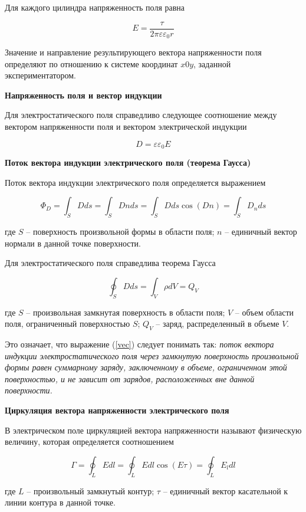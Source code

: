 Для каждого цилиндра напряженность поля равна 

\begin{equation}
	E = \dfrac{\tau}{2\pi\varepsilon\varepsilon_0r}
\end{equation}

Значение и направление результирующего вектора напряженности поля
определяют по отношению к системе координат $ x0y $, заданной
экспериментатором. 

\textbf{Напряженность поля и вектор индукции}

Для электростатического
поля справедливо следующее соотношение между вектором напряженности
поля и вектором электрической индукции

\begin{equation}\label{vec}
	D = \varepsilon\varepsilon_0E
\end{equation}

\textbf{Поток вектора индукции электрического поля (теорема Гаусса)}

Поток вектора индукции электрического поля определяется выражением

\begin{equation}
	\Phi_D = \int_S Dds = \int_S Dnds = \int_S Dds\cos(Dn) = \int_S D_n ds
\end{equation}

где $ S $ – поверхность произвольной формы в области поля; $ n $ – единичный
вектор нормали в данной точке поверхности. 

Для электростатического поля справедлива теорема Гаусса

\begin{equation}
	\oint_S Dds = \int_V \rho dV = Q_V
\end{equation}

где $ S $ – произвольная замкнутая поверхность в области поля; $ V $ – объем
области поля, ограниченный поверхностью $ S $; $ Q_V $ – заряд, распределенный в
объеме $ V $. 


Это означает, что выражение (\ref{vec}) следует понимать так: \textit{поток вектора
индукции электростатического поля через замкнутую поверхность
произвольной формы равен суммарному заряду, заключенному в объеме,
ограниченном этой поверхностью, и не зависит от зарядов, расположенных
вне данной поверхности. 
}

\textbf{Циркуляция вектора напряженности электрического поля}

В электрическом поле циркуляцией вектора напряженности
называют физическую величину, которая определяется соотношением 

\begin{equation}\label{key}
	\Gamma = \oint_L Edl = \oint_L Edl\cos(E\tau) = \oint_L E_l dl
\end{equation}

где $ L $ – произвольный замкнутый контур; $ \tau $ – единичный вектор касательной
к линии контура в данной точке. 